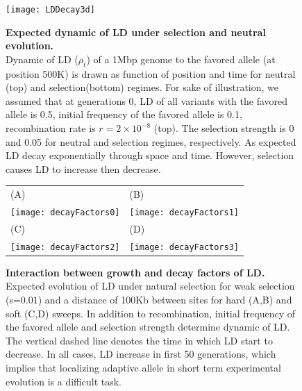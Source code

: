 \begin{figure}[H]
	\centering
	\texttt{[image: LDDecay3d]}
	\caption{ {\bf Expected dynamic of LD under selection and neutral 
	evolution.}\\ Dynamic of LD ($\rho_t$) of a 1Mbp genome to the favored 
	allele 
	(at position 500K) is drawn as function of position and time for neutral 
	(top) and selection(bottom) regimes.
	For sake of illustration, we assumed that at generations 0, LD of all 
	variants with the favored allele is 0.5, initial frequency of the favored 
	allele is 0.1, recombination rate is $r=2\times10^{-8}$ (top). The 
	selection strength is 0 and 0.05 for neutral and selection regimes, 
	respectively. As expected LD decay exponentially  through space and time. 
	However, selection causes LD to increase then decrease.}	
		\label{fig:ld3d}
\end{figure}

\begin{figure}[H]
	\centering
	\begin{tabular}{l|l}
		(A)&(B)\\
		\texttt{[image: decayFactors0]}
		&\texttt{[image: decayFactors1]}\\
		\hline(C)&(D)\\
		\texttt{[image: decayFactors2]}
		&\texttt{[image: decayFactors3]}		
	\end{tabular}
	
	\caption{{\bf Interaction between growth and decay factors of LD.}\\
		Expected evolution of LD under natural 
		selection for weak selection (s=$0.01$) and a distance of 100Kb between 
		sites for hard (A,B) and soft (C,D) sweeps. In addition to 
		recombination, initial frequency of the favored allele and selection 
		strength determine dynamic of LD. The vertical dashed line denotes the 
		time in which LD start to decrease. In all cases, LD increase in first 
		50 generations, which implies that localizing adaptive allele in short 
		term experimental evolution is a difficult task.} \label{fig:ldf}
\end{figure}



